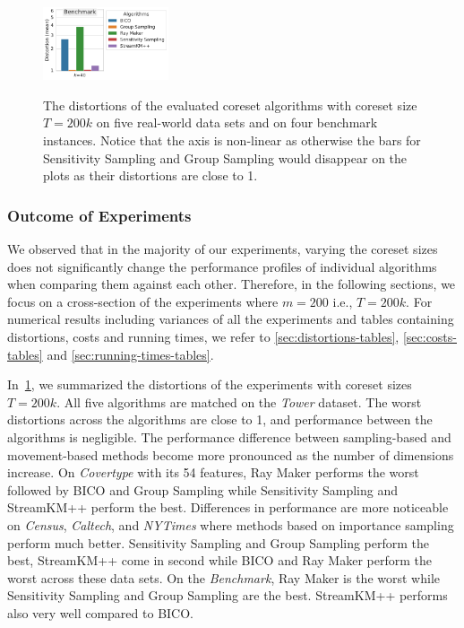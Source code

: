 \begin{figure}
{    \includegraphics[width=0.331\textwidth]{figures/distortions-mean-Benchmark-k40.pdf}
  }
  \caption{The distortions of the evaluated coreset algorithms with coreset size $T=200k$ on five real-world data sets and on four benchmark instances. Notice that the axis is non-linear as otherwise the bars for Sensitivity Sampling and Group Sampling would disappear on the plots as their distortions are close to 1.}
  \label{fig:distortions}
\end{figure}







\subsubsection*{Outcome of Experiments}
We observed that in the majority of our experiments, varying the coreset sizes does not significantly change the performance profiles of individual algorithms when comparing them against each other. Therefore, in the following sections, we focus on a cross-section of the experiments where $m=200$ i.e., $T=200k$.
For numerical results including variances of all the experiments and tables containing distortions, costs and running times, we refer to \cref{sec:distortions-tables}, \cref{sec:costs-tables} and \cref{sec:running-times-tables}. 

In~\cref{fig:distortions}, we summarized the distortions of the experiments with coreset sizes $T=200k$. All five algorithms are matched on the \textit{Tower} dataset. The worst distortions across the algorithms are close to 1, and performance between the algorithms is negligible. The performance difference between sampling-based and movement-based methods become more pronounced as the number of dimensions increase. On \textit{Covertype} with its 54 features, Ray Maker performs the worst followed by BICO and Group Sampling while Sensitivity Sampling and StreamKM++ perform the best. Differences in performance are more noticeable on \textit{Census}, \textit{Caltech}, and \textit{NYTimes}  where methods based on importance sampling perform much better. Sensitivity Sampling and Group Sampling perform the best, StreamKM++ come in second while BICO and Ray Maker perform the worst across these data sets.
On the \textit{Benchmark}, Ray Maker is the worst while Sensitivity Sampling and Group Sampling are the best. StreamKM++ performs also very well compared to BICO.

